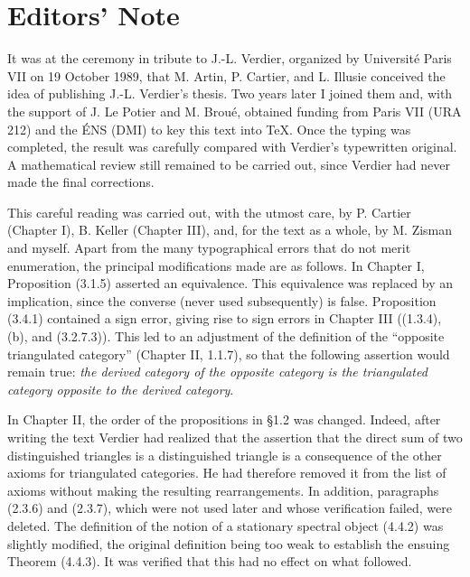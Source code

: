 \chapter*{Editors' Note}

It was at the ceremony in tribute to J.-L. Verdier, organized by Université
Paris VII on 19 October 1989, that M. Artin, P. Cartier, and L. Illusie
conceived the idea of publishing J.-L. Verdier's thesis. Two years later I
joined them and, with the support of J. Le Potier and M. Broué, obtained funding
from Paris VII (URA 212) and the ÉNS (DMI) to key this text into \TeX{}. Once
the typing was completed, the result was carefully compared with Verdier's
typewritten original. A mathematical review still remained to be carried out,
since Verdier had never made the final corrections.

This careful reading was carried out, with the utmost care, by P. Cartier
(Chapter I), B. Keller (Chapter III), and, for the text as a whole, by
M. Zisman and myself. Apart from the many typographical errors that do not
merit enumeration, the principal modifications made are as follows. In
Chapter I, Proposition (3.1.5) asserted an equivalence. This equivalence was
replaced by an implication, since the converse (never used subsequently) is
false. Proposition (3.4.1) contained a sign error, giving rise to sign errors
in Chapter III ((1.3.4), (b), and (3.2.7.3)). This led to an adjustment of the
definition of the ``opposite triangulated category'' (Chapter II, 1.1.7), so
that the following assertion would remain true: \emph{the derived category of
the opposite category is the triangulated category opposite to the derived
category}.

In Chapter II, the order of the propositions in §1.2 was changed. Indeed,
after writing the text Verdier had realized that the assertion that the direct
sum of two distinguished triangles is a distinguished triangle is a
consequence of the other axioms for triangulated categories. He had therefore
removed it from the list of axioms without making the resulting rearrangements.
In addition, paragraphs (2.3.6) and (2.3.7), which were not used later and
whose verification failed, were deleted. The definition of the notion of a
stationary spectral object (4.4.2) was slightly modified, the original
definition being too weak to establish the ensuing Theorem (4.4.3). It was
verified that this had no effect on what followed.

